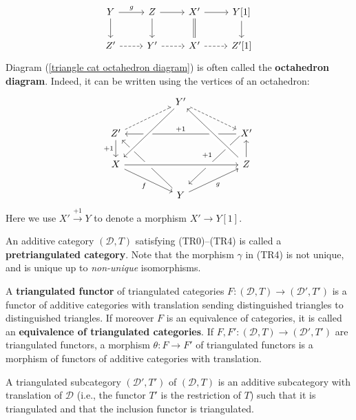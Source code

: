 \begin{definition}
\begin{enumerate}[leftmargin=40pt]
\begin{equation}
\begin{tikzcd}
    Y\ar[r,"g"]\ar[d]&Z\ar[r]\ar[d]&X'\ar[r]\ar[d,equal]&Y[1]\ar[d]\\
    Z'\ar[r,dashed]&Y'\ar[r,dashed]&X'\ar[r,dashed]&Z'[1]
    \end{tikzcd}
    \end{equation}
    Diagram (\ref{triangle cat octahedron diagram}) is often called the \textbf{octahedron diagram}. Indeed, it can be written using the vertices of an octahedron:
    \[\begin{tikzcd}
    &&Y'&&\\
    Z'&&&&X'\\
    X&&&&Z\\
    &&Y&&
    \arrow[from=2-1,to=1-3,dashed]
    \arrow[from=1-3,to=2-5,dashed]
    \arrow[from=2-1,to=3-1,swap,"+1"]
    \arrow[from=3-5,to=2-5]
    \arrow[from=2-5,to=4-3,swap,"+1",yshift=1ex]
    \arrow[from=4-3,to=2-1]
    \arrow[from=4-3,to=3-5,swap,"g"]
    \arrow[from=2-5,to=2-1,swap,"+1"]
    \arrow[from=3-5,to=1-3,crossing over]
    \arrow[from=3-1,to=4-3,swap,"f"]
    \arrow[from=1-3,to=3-1,crossing over]
    \arrow[from=3-1,to=3-5,crossing over]
    \end{tikzcd}\]
    Here we use $X'\stackrel{+1}{\to} Y$ to denote a morphism $X'\to Y[1]$.
\end{enumerate}
\end{definition}
An additive category $(\mathcal{D},T)$ satisfying (TR0)--(TR4) is called a \textbf{pretriangulated category}. Note that the morphism $\gamma$ in (TR4) is not unique, and is unique up to \textit{non-unique} isomorphisms.

\begin{definition}
A \textbf{triangulated functor} of triangulated categories $F:(\mathcal{D},T)\to(\mathcal{D}',T')$ is a functor of additive categories with translation sending distinguished triangles to distinguished triangles. If moreover $F$ is an equivalence of categories, it is called an \textbf{equivalence of triangulated categories}. If $F,F':(\mathcal{D},T)\to(\mathcal{D}',T')$ are triangulated functors, a morphism $\theta:F\to F'$ of triangulated functors is a morphism of functors of additive categories with translation.\par
A triangulated subcategory $(\mathcal{D}',T')$ of $(\mathcal{D},T)$ is an additive subcategory with translation of $\mathcal{D}$ (i.e., the functor $T'$ is the restriction of $T$) such that it is triangulated and that the inclusion functor is triangulated.
\end{definition}

